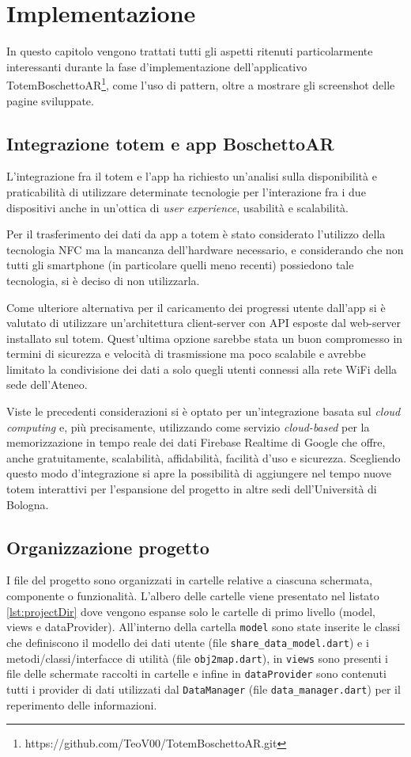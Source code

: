\chapter{Implementazione}
In questo capitolo vengono trattati tutti gli aspetti ritenuti particolarmente interessanti durante la fase d'implementazione dell'applicativo TotemBoschettoAR\footnote{https://github.com/TeoV00/TotemBoschettoAR.git}, come l'uso di pattern, oltre a mostrare gli screenshot delle pagine sviluppate.

\section{Integrazione totem e app BoschettoAR}
L'integrazione fra il totem e l'app ha richiesto un'analisi sulla disponibilità e praticabilità di utilizzare determinate tecnologie per l'interazione fra i due dispositivi anche in un'ottica di \textit{user experience}, usabilità e scalabilità.

Per il trasferimento dei dati da app a totem è stato considerato l'utilizzo della tecnologia NFC ma la mancanza dell'hardware necessario, e considerando che non tutti gli smartphone (in particolare quelli meno recenti) possiedono tale tecnologia, si è deciso di non utilizzarla.

Come ulteriore alternativa per il caricamento dei progressi utente dall'app si è valutato di utilizzare un'architettura client-server con API esposte dal web-server installato sul totem. Quest'ultima opzione sarebbe stata un buon compromesso in termini di sicurezza e velocità di trasmissione ma poco scalabile e avrebbe limitato la condivisione dei dati a solo quegli utenti connessi alla rete WiFi della sede dell'Ateneo.

Viste le precedenti considerazioni si è optato per un'integrazione basata sul \textit{cloud computing} e, più precisamente, utilizzando come servizio \textit{cloud-based} per la memorizzazione in tempo reale dei dati Firebase Realtime di Google \cite{firebase} che offre, anche gratuitamente, scalabilità, affidabilità, facilità d'uso e sicurezza.
Scegliendo questo modo d'integrazione si apre la possibilità di aggiungere nel tempo nuove totem interattivi per l'espansione del progetto in altre sedi dell'Università di Bologna.

\section{Organizzazione progetto}
I file del progetto sono organizzati in cartelle relative a ciascuna schermata, componente o funzionalità. L'albero delle cartelle viene presentato nel listato \ref{lst:projectDir} dove vengono espanse solo le cartelle di primo livello (model, views e dataProvider). All'interno della cartella \texttt{model} sono state inserite le classi che definiscono il modello dei dati utente (file \texttt{share\_data\_model.dart}) e i metodi/classi/interfacce di utilità (file \texttt{obj2map.dart}), in \texttt{views} sono presenti i file delle schermate raccolti in cartelle e infine in \texttt{dataProvider} sono contenuti tutti i provider di dati utilizzati dal \texttt{DataManager} (file \texttt{data\_manager.dart}) per il reperimento delle informazioni.

